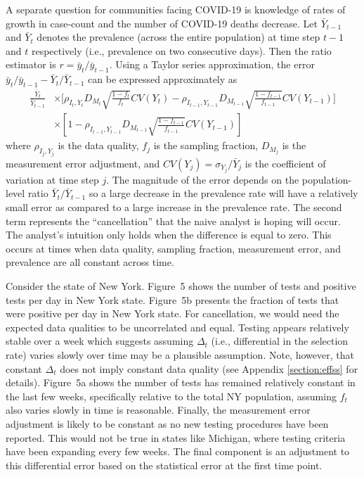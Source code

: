 \documentclass[12pt]{article}
\begin{document}
A separate question for communities facing COVID-19 is knowledge of rates of growth in case-count and the number of COVID-19 deaths decrease.  Let $\bar Y_{t-1}$ and $\bar Y_{t}$ denotes the prevalence (across the entire population) at time step $t-1$ and $t$ respectively (i.e., prevalence on two consecutive days).  Then the ratio estimator is $r = \bar y_t / \bar y_{t-1}$.  Using a Taylor series approximation, the error ${\bar y_t}/{\bar y_{t-1}} - {\bar Y_{t}}/{\bar Y_{t-1}}$ can be expressed approximately as
$$
\begin{aligned}
\frac{\bar Y_t}{\bar Y_{t-1}} &\times \bigg[ \rho_{I_t,Y_t} D_{M_t} \sqrt{\frac{1-f_t}{f_t}} CV (Y_t)  -\rho_{I_{t-1},Y_{t-1}} D_{M_{t-1}} \sqrt{\frac{1-f_{t-1}}{f_{t-1}}} CV (Y_{t-1}) \bigg] \\
&\times \left[ 1 - \rho_{I_{t-1},Y_{t-1}} D_{M_{t-1}} \sqrt{\frac{1-f_{t-1}}{f_{t-1}}} CV (Y_{t-1}) \right]
\end{aligned}
$$
where $\rho_{I_j, Y_j}$ is the data quality, $f_j$ is the sampling fraction, $D_{M_j}$ is the measurement error adjustment, and $CV(Y_j) = \sigma_{Y_j}/\bar Y_j$ is the coefficient of variation at time step $j$.  The magnitude of the error depends on the population-level ratio $\bar Y_{t} / \bar Y_{t-1}$ so a large decrease in the prevalence rate will have a relatively small error as compared to a large increase in the prevalence rate. The second term represents the ``cancellation'' that the naive analyst is hoping will occur.  The analyst's intuition only holds when the difference is equal to zero.  This occurs at times when data quality, sampling fraction, measurement error, and prevalence are all constant across time.

Consider the state of New York.  Figure~5 shows the number of tests and positive tests per day in New York state.  Figure~5b presents the fraction of tests that were positive per day in New York state.  For cancellation, we would need the expected data qualities to be uncorrelated and equal. Testing appears relatively stable over a week which suggests assuming $\Delta_t$ (i.e., differential in the selection rate) varies slowly over time may be a plausible assumption.  Note, however, that constant $\Delta_t$ does not imply constant data quality (see Appendix \ref{section:effss} for details).  Figure~5a shows the number of tests has remained relatively constant in the last few weeks, specifically relative to the total NY population, assuming $f_t$ also varies slowly in time is reasonable. Finally, the measurement error adjustment is likely to be constant as no new testing procedures have been reported.  This would not be true in states like Michigan, where testing criteria have been expanding every few weeks.  The final component is an adjustment to this differential error based on the statistical error at the first time point.
\end{document}
